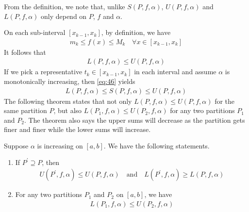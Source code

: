 \documentclass[thmcnt=section, 12pt]{my-elegantbook}
\begin{document}
\begin{note}
    From the definition, we note that, unlike $S(P,f,\alpha)$, $U(P,f,\alpha)$ and $L(P,f,\alpha)$ only depend on $P$, $f$ and $\alpha$.
\end{note}

On each sub-interval $[x_{k-1}, x_k]$, by definition, we have 
\begin{align}
    m_k \leq f(x) \leq M_k
    \quad \forall x \in [x_{k-1}, x_k]
    \label{eq:46}
\end{align}
It follows that 
\begin{align}
    L(P,f,\alpha) \leq U(P,f,\alpha)
    \label{eq:45}
\end{align}
If we pick a representative $t_k \in [x_{k-1}, x_k]$ in each interval and assume $\alpha$ is monotonically increasing, then \eqref{eq:46} yields
\begin{align*}
    L(P,f,\alpha) \leq S(P,f,\alpha) \leq U(P,f,\alpha)
\end{align*}
The following theorem states that not only $L(P,f,\alpha) \leq U(P,f,\alpha)$ for the same partition $P$, but also $L(P_1,f,\alpha) \leq U(P_2,f,\alpha)$ for any two partitions $P_1$ and $P_2$. The theorem also says the upper sums will decrease as the partition gets finer and finer while the lower sums will increase.

\begin{theorem} \label{thm:26}
    Suppose $\alpha$ is increasing on $[a, b]$. We have the following statements.
    \begin{enumerate}
        \item If $P^\prime \supseteq P$, then 
        \begin{align*}
            U(P^\prime,f,\alpha) \leq U(P,f,\alpha)
            \quad\text{and}\quad
            L(P^\prime,f,\alpha) \geq L(P,f,\alpha)
        \end{align*}
        \item For any two partitions $P_1$ and $P_2$ on $[a, b]$, we have 
        \begin{align*}
            L(P_1, f, \alpha) \leq U(P_2, f, \alpha)
        \end{align*}
    \end{enumerate}
\end{theorem}
\end{document}
